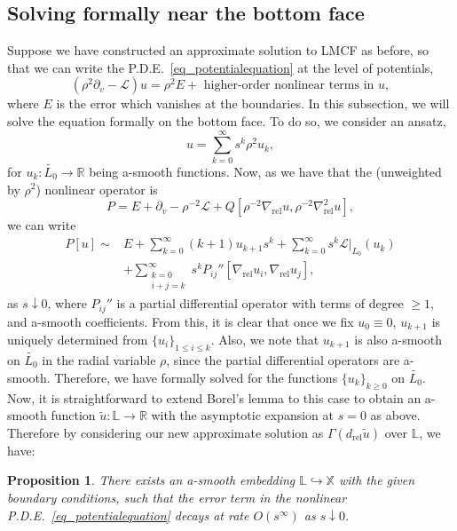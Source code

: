 \documentclass[10pt, a4paper]{article}
\theoremstyle{plain}%
\newtheorem{prop}[theorem]{Proposition}
\theoremstyle{definition}
\numberwithin{figure}{section}
\numberwithin{equation}{section}
\newcommand{\bL}{\mathbb{L}}
\newcommand{\bX}{\mathbb{X}}
\newcommand{\bR}{\mathbb{R}}
\newcommand{\pa}{\partial}
\newcommand{\rt}{\rightarrow}
\newcommand{\tu}{\tilde{u}}
\newcommand{\cL}{\mathcal{L}}
\newcommand{\rel}{\mathrm{rel}}
\begin{document}
 \subsection{Solving formally near the bottom face}
Suppose we have constructed an approximate solution to LMCF as before, so that we can write the P.D.E.\ \eqref{eq_potentialequation} at the level of potentials, \[(\rho^2\pa_v-\cL)u = \rho^2E + \textrm{ higher-order nonlinear terms in }u, \]
where $E$ is the error which vanishes at the boundaries. In this subsection, we will solve the equation formally on the bottom face. To do so, we consider an ansatz, \[
u = \sum_{k=0}^\infty s^k\rho^2u_k,
\]
for $u_k : \widetilde{L_0} \rt \bR$ being a-smooth functions. Now, as we have that the (unweighted by $\rho^2$) nonlinear operator is \[
P = E + \pa_v - \rho^{-2}\cL + Q[\rho^{-2}\nabla_\rel u,\rho^{-2}\nabla^2_{\rel}u],
\]
 we can write
\begin{equation}
	\begin{split}
		P[u] \sim & E+  \sum_{k=0}^\infty (k+1)u_{k+1}s^k+ \sum_{k=0}^\infty s^k{\cL|_{L_0}}(u_{k}) \\
		& + \sum_{\substack{k=0 \\ i+j=k}}^\infty s^kP_{ij}''[\nabla_\rel u_i,\nabla_\rel u_j],
	\end{split}
\end{equation}
as $s\downarrow 0$, where $P_{ij}''$ is a partial differential operator with terms of degree $\geq1$, and a-smooth coefficients. From this, it is clear that once we fix $u_0\equiv 0$, $u_{k+1}$ is uniquely determined from $\{u_i\}_{1\leq i\leq k}$. Also, we note that $u_{k+1}$ is also a-smooth on $\widetilde{L_0}$ in the radial variable $\rho$, since the partial differential operators are a-smooth. Therefore, we have formally solved for the functions $\{u_k\}_{k\geq0 }$ on $\widetilde{L_0}$. Now, it is straightforward to extend Borel's lemma to this case to obtain an a-smooth function $\tu:\bL\rt \bR$ with the asymptotic expansion at $s=0$ as above. Therefore by considering our new approximate solution as $\Gamma(d_\rel \tu)$ over $\bL$, we have:
\begin{prop}\label{prop_bottomfacesolving}
There exists an a-smooth embedding $\bL\hookrightarrow \bX$ with the given boundary conditions, such that the error term in the nonlinear P.D.E.\ \eqref{eq_potentialequation} decays at rate $O(s^\infty)$ as $s\downarrow 0$.  
\end{prop}
\end{document}
